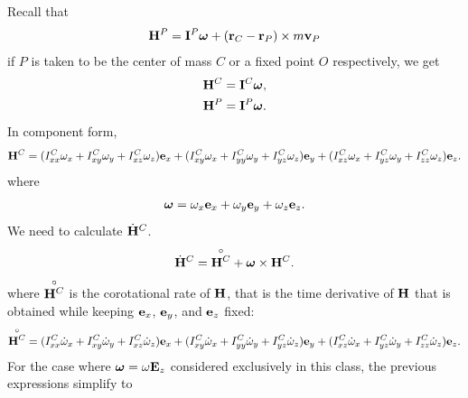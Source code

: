 \documentclass[
  letterpaper,
  DIV=11,
  numbers=noendperiod]{scrreprt}
\newcommand{\bomega}{\boldsymbol{\omega}}
\begin{document}
Recall that \begin{align}
    \begin{split}
        {\bf H}^P = {\bf I}^P\bomega+({\bf r}_C-{\bf r}_P)\times m{\bf v}_P
    \end{split}
\end{align} if \(P\) is taken to be the center of mass \(C\) or a fixed
point \(O\) respectively, we get \begin{align}
    \begin{split}
        {\bf H}^C = {\bf I}^C\bomega,\\
        {\bf H}^P = {\bf I}^P\bomega.
    \end{split}
\end{align} In component form, \begin{align}
    {\bf H}^C = (I_{xx}^C\omega_x+I_{xy}^C\omega_y+I_{xz}^C\omega_z){\bf e}_x+(I_{xy}^C\omega_x+I_{yy}^C\omega_y+I_{yz}^C\omega_z){\bf e}_y+(I_{xz}^C\omega_x+I_{yz}^C\omega_y+I_{zz}^C\omega_z){\bf e}_z.
\end{align} where \begin{align}
    \bomega = \omega_x{\bf e}_x+\omega_y{\bf e}_y+\omega_z{\bf e}_z.
\end{align} We need to calculate \(\dot{\bf H}^C\). \begin{align}
    \dot{\bf H}^C=\overset{\circ}{{\bf H}^C}+\bomega\times{\bf H}^C.
\end{align} where \(\overset{\circ}{{\bf H}^C}\) is the corotational
rate of \({\bf H}\), that is the time derivative of \({\bf H}\) that is
obtained while keeping \({\bf e}_x\), \({\bf e}_y\), and \({\bf e}_z\)
fixed: \begin{align}
    \overset{\circ}{{\bf H}^C} = (I_{xx}^C\dot{\omega}_x+I_{xy}^C\dot{\omega}_y+I_{xz}^C\dot{\omega}_z){\bf e}_x+(I_{xy}^C\dot{\omega}_x+I_{yy}^C\dot{\omega}_y+I_{yz}^C\dot{\omega}_z){\bf e}_y+(I_{xz}^C\dot{\omega}_x+I_{yz}^C\dot{\omega}_y+I_{zz}^C\dot{\omega}_z){\bf e}_z.
\end{align} For the case where \(\bomega=\omega{\bf E}_z\) considered
exclusively in this class, the previous expressions simplify to
\end{document}
